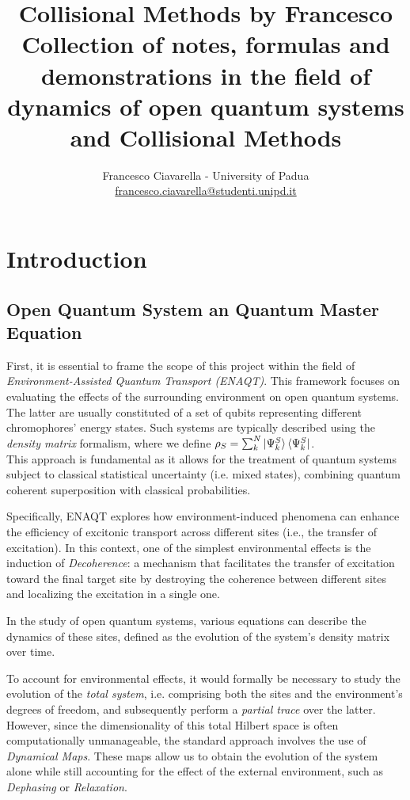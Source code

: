 \documentclass[a4paper,12pt]{article}
\title{
\vspace{2cm}
\Huge \textbf{Collisional Methods by Francesco} \\[0.5cm]
\large Collection of notes, formulas and demonstrations in the field of dynamics of open quantum systems and Collisional Methods
\vspace{5cm}
}
\author{\Large Francesco Ciavarella - University of Padua \\[10pt] \href{mailto:francesco.ciavarella@studenti.unipd.it}{francesco.ciavarella@studenti.unipd.it}}
\begin{document}
	\maketitle
	\thispagestyle{empty}
	\newpage

	\tableofcontents
	\newpage

	\section{Introduction}
	\label{sec:intro}

	\subsection{Open Quantum System an Quantum Master Equation}
	\label{sub:open_quantum_sys_QME}
	First, it is essential to frame the scope of this project within the field of \textit{Environment-Assisted Quantum Transport (ENAQT)}. This framework focuses on evaluating the effects of the surrounding environment on open quantum systems. The latter are usually constituted of a set of qubits representing different chromophores' energy states.
	Such systems are typically described using the \textit{density matrix} formalism, where we define $ \rho_S = \sum_{k}^{N}{\ket{\Psi_{k}^{S}}\bra{\Psi_{k}^{S}}} $.\\
	This approach is fundamental as it allows for the treatment of quantum systems subject to classical statistical uncertainty (i.e. mixed states), combining quantum coherent superposition with classical probabilities.

	Specifically, ENAQT explores how environment-induced phenomena can enhance the efficiency of excitonic transport across different sites (i.e., the transfer of excitation). In this context, one of the simplest environmental effects is the induction of \textit{Decoherence}: a mechanism that facilitates the transfer of excitation toward the final target site by destroying the coherence between different sites and localizing the excitation in a single one.

	In the study of open quantum systems, various equations can describe the dynamics of these sites, defined as the evolution of the system's density matrix over time.

	To account for environmental effects, it would formally be necessary to study the evolution of the \textit{total system}, i.e. comprising both the sites and the environment's degrees of freedom, and subsequently perform a \textit{partial trace} over the latter. However, since the dimensionality of this total Hilbert space is often computationally unmanageable, the standard approach involves the use of \textit{Dynamical Maps}. These maps allow us to obtain the evolution of the system alone while still accounting for the effect of the external environment, such as \textit{Dephasing} or \textit{Relaxation}.
\end{document}
